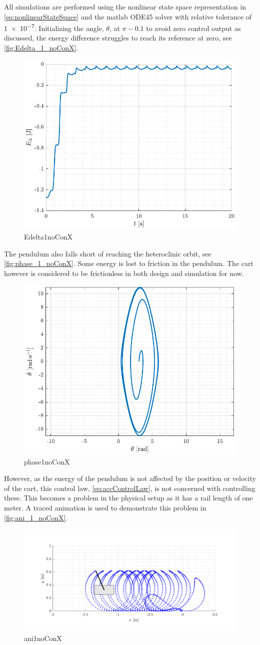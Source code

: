 All simulations are performed using the nonlinear state space representation in \autoref{eq:nonlinearStateSpace} and the matlab ODE45 solver with relative tolerance of \SI{1e-7}{}. Initializing the angle, $\theta$, at $\pi-0.1$ to avoid zero control output as discussed, the energy difference struggles to reach its reference at zero, see \autoref{fig:Edelta_1_noConX}.
%
\begin{figure}[H]
  \includegraphics[width=.5\textwidth]{figures/Edelta_1_noConX}
  \caption{Edelta1noConX}
  \label{fig:Edelta_1_noConX}
\end{figure}
%
The pendulum also falls short of reaching the heteroclinic orbit, see \autoref{fig:phase_1_noConX}. 
Some energy is lost to friction in the pendulum. The cart however is considered to be frictionless in both design and simulation for now.
\begin{figure}[H]
  \includegraphics[width=.5\textwidth]{figures/phase_1_noConX}
  \caption{phase1noConX}
  \label{fig:phase_1_noConX}
\end{figure}
%
However, as the energy of the pendulum is not affected by the position or velocity of the cart, this control law, \autoref{eq:accControlLaw}, is not concerned with controlling these. This becomes a problem in the physical setup as it has a rail length of one meter. A traced animation is used to demonstrate this problem in \autoref{fig:ani_1_noConX}.
\begin{figure}[H]
  \includegraphics[width=.7\textwidth]{figures/ani_1_noConX}
  \caption{ani1noConX}
  \label{fig:ani_1_noConX}
\end{figure}
